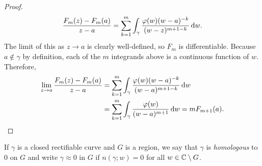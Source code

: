 \begin{proof}
			\[ \frac{F_m(z) - F_m(a)}{z-a} = \sum_{k=1}^m \int_\gamma \frac{\varphi(w)(w-a)^{-k}}{(w-z)^{m+1-k}} \dif w. \]
			The limit of this as $z\to a$ is clearly well-defined, so $F_m$ is differentiable. Because $a\not\in\gamma$ by definition, each of the $m$ integrands above is a continuous function of $w$.\\
			Therefore,
			\begin{align*}
				\lim_{z\to a} \frac{F_m(z) - F_m(a)}{z-a} &= \sum_{k=1}^m \int_\gamma \frac{\varphi(w)(w-a)^{-k}}{(w-a)^{m+1-k}} \dif w \\
					&= \sum_{k=1}^m \int_\gamma \frac{\varphi(w)}{(w-a)^{m+1}} \dif w = m F_{m+1}(a). \qedhere
			\end{align*}
		\end{proof}

		\begin{definition}
			If $\gamma$ is a closed rectifiable curve and $G$ is a region, we say that $\gamma$ is \emph{homologous} to $0$ on $G$ and write $\gamma \approx 0$ in $G$ if $n(\gamma;w) = 0$ for all $w \in \mathbb{C}\setminus G$.
		\end{definition}

